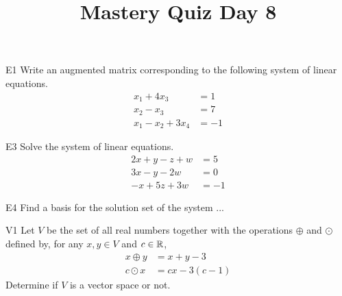 \documentclass{sbgLAquiz}
\title{Mastery Quiz Day 8 }
\begin{document}
\begin{problem}{E1}
Write an augmented matrix corresponding to the following system of linear equations.
\begin{align*}
x_1+4x_3 &= 1 \\
x_2-x_3 &= 7 \\
x_1-x_2+3x_4 &= -1
\end{align*}
\end{problem}

\begin{problem}{E3}
Solve the system of linear equations.
\begin{align*}
2x+y-z+w &=5 \\
3x-y-2w &= 0 \\
-x+5z+3w&=-1
\end{align*}
\end{problem}
\newpage

\begin{problem}{E4}
Find a basis for the solution set of the system ...
\end{problem}

\begin{problem}{V1}
Let $V$ be the  set of all real numbers together with the operations $\oplus$ and $\odot$ defined by, for any $x,y \in V$ and $c \in \mathbb{R}$,
\begin{align*}
x\oplus y  &= x+y-3 \\
c \odot x &= cx-3(c-1)
\end{align*}
Determine if $V$ is a vector space or not.
\end{problem}
\end{document}
